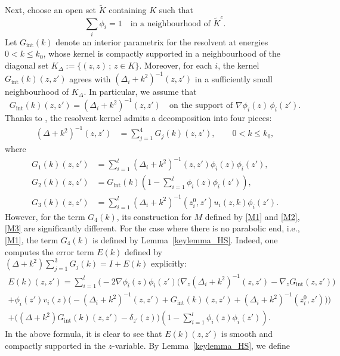 \documentclass[12pt]{amsart}
\begin{document}
Next, choose an open set $\widetilde{K}$ containing $K$ such that 
\[
\sum_i \phi_i = 1 \quad \text{in a neighbourhood of } \widetilde{K}^c.
\]
Let $G_{\mathrm{int}}(k)$ denote an interior parametrix for the resolvent at energies $0 < k \leq k_0$, whose kernel is compactly supported in a neighbourhood of the diagonal set 
$
K_{\Delta} := \{(z,z) \,;\, z \in K\}.
$
Moreover, for each $i$, the kernel $G_{\mathrm{int}}(k)(z,z')$ agrees with $(\Delta_i + k^2)^{-1}(z,z')$ in a sufficiently small neighbourhood of $K_{\Delta}$.  
In particular, we assume that 
\[
G_{\mathrm{int}}(k)(z,z') = (\Delta_i + k^2)^{-1}(z,z') 
\quad \text{on the support of } \nabla \phi_i(z)\,\phi_i(z').
\] 
Thanks to \cite{HS,HNS}, the resolvent kernel admits a decomposition into four pieces:
\begin{align*}
(\Delta + k^2)^{-1}(z,z') 
    &= \sum_{j=1}^4 G_j(k)(z,z'), 
    \qquad 0 < k \leq k_0,
\end{align*}
where
\begin{align}\label{G1}
G_1(k)(z,z') &= \sum_{i=1}^l (\Delta_{i} +k^2)^{-1}(z,z') \phi_i(z) \phi_i(z'),\\ \label{G2}
G_2(k)(z,z') &= G_{\textrm{int}}(k)  \left(1-\sum_{i=1}^l \phi_i(z)\phi_i(z')\right),\\ \label{G3}
G_3(k)(z,z') &= \sum_{i=1}^l (\Delta_{i} +k^2)^{-1}(z_i^0,z') u_i(z,k)\phi_i(z').
\end{align}
However, for the term $G_4(k)$, its construction for $M$ defined by \eqref{M1} and \eqref{M2}, \eqref{M3} are significantly different. For the case where there is no parabolic end, i.e., \eqref{M1}, the term $G_4(k)$ is defined by Lemma~\ref{keylemma_HS}. Indeed, one computes the error term $E(k)$ defined by $(\Delta+k^2)\sum_{j=1}^3 G_j(k) = I + E(k)$ explicitly:
\begin{align}\label{eq_error1}
E(k)(z,z') = \sum_{i = 1}^l \Big( -2 \nabla \phi_i(z) \phi_i(z') \big(\nabla_z (\Delta_{i} + k^2)^{-1}(z,z') - \nabla_z G_{\textrm{int}}(z,z')\big)\\ \label{eq_error2}
    +\phi_i(z') v_i(z) \big( -(\Delta_{i} + k^2)^{-1}(z,z') + G_{\textrm{int}}(k)(z,z') + (\Delta_{i} + k^2)^{-1}(z_i^0,z')\big) \Big)\\ \label{eq_error3}
    + \big( (\Delta + k^2)G_{\textrm{int}}(k)(z,z') - \delta_{z'}(z)\big) \left(1-\sum_{i=1}^l \phi_i(z)\phi_i(z')\right).
\end{align}
In the above formula, it is clear to see that $E(k)(z,z')$ is smooth and compactly supported in the $z$-variable. By Lemma~\ref{keylemma_HS}, we define 
\end{document}
